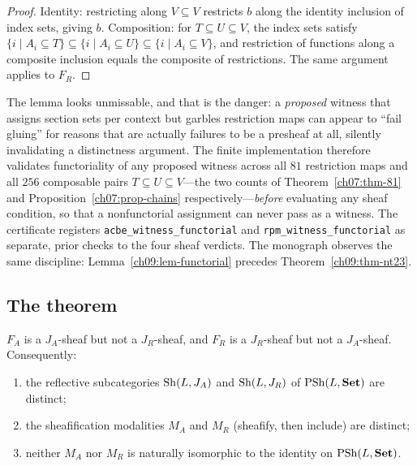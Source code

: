 \begin{proof}
Identity: restricting along $V\subseteq V$ restricts $b$ along the identity inclusion of index sets, giving $b$. Composition: for $T\subseteq U\subseteq V$, the index sets satisfy $\{i\mid A_{i}\subseteq T\}\subseteq\{i\mid A_{i}\subseteq U\}\subseteq\{i\mid A_{i}\subseteq V\}$, and restriction of functions along a composite inclusion equals the composite of restrictions. The same argument applies to $F_{R}$.
\end{proof}

\begin{remark}\label{ch09:rem-functorial-first}
The lemma looks unmissable, and that is the danger: a \emph{proposed} witness that assigns section sets per context but garbles restriction maps can appear to ``fail gluing'' for reasons that are actually failures to be a presheaf at all, silently invalidating a distinctness argument. The finite implementation therefore validates functoriality of any proposed witness across all $81$ restriction maps and all $256$ composable pairs $T\subseteq U\subseteq V$---the two counts of Theorem~\ref{ch07:thm-81} and Proposition~\ref{ch07:prop-chains} respectively---\emph{before} evaluating any sheaf condition, so that a nonfunctorial assignment can never pass as a witness. The certificate registers \texttt{acbe\_witness\_functorial} and \texttt{rpm\_witness\_functorial} as separate, prior checks to the four sheaf verdicts. The monograph observes the same discipline: Lemma~\ref{ch09:lem-functorial} precedes Theorem~\ref{ch09:thm-nt23}.
\end{remark}

\subsection{The theorem}

\begin{theorem}\label{ch09:thm-nt23}
$F_{A}$ is a $J_{A}$-sheaf but not a $J_{R}$-sheaf, and $F_{R}$ is a $J_{R}$-sheaf but not a $J_{A}$-sheaf. Consequently:
\begin{enumerate}
\item the reflective subcategories $\mathrm{Sh}(L,J_{A})$ and $\mathrm{Sh}(L,J_{R})$ of $\mathrm{PSh}(L,\mathbf{Set})$ are distinct;
\item the sheafification modalities $M_{A}$ and $M_{R}$ (sheafify, then include) are distinct;
\item neither $M_{A}$ nor $M_{R}$ is naturally isomorphic to the identity on $\mathrm{PSh}(L,\mathbf{Set})$.
\end{enumerate}
\end{theorem}

